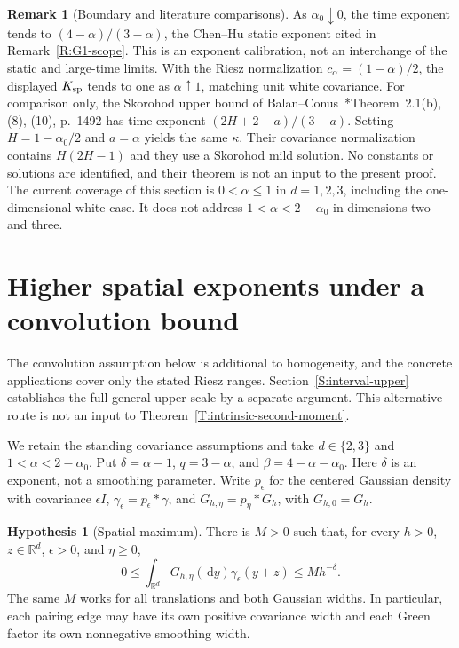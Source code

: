 \documentclass[12pt]{article}
\numberwithin{equation}{section}
\theoremstyle{definition}
\newtheorem{hypothesis}[theorem]{Hypothesis}
\newtheorem{remark}[theorem]{Remark}
\newcommand{\R}{\mathbb{R}}
\newcommand{\ud}{\,\mathrm{d}}
\begin{document}
\begin{remark}[Boundary and literature comparisons]\label{R:d1-comparisons}
  As $\alpha_0\downarrow0$, the time exponent tends to
  $(4-\alpha)/(3-\alpha)$, the Chen--Hu static exponent cited in
  Remark~\ref{R:G1-scope}. This is an exponent calibration, not an
  interchange of the static and large-time limits. With the Riesz
  normalization $c_\alpha=(1-\alpha)/2$, the displayed $K_{\rm sp}$
  tends to one as $\alpha\uparrow1$, matching unit white covariance.
  For comparison only, the Skorohod upper bound of
  Balan--Conus~\cite{balan.conus:16:intermittency}*{Theorem~2.1(b),
  (8), (10), p.~1492} has time exponent $(2H+2-a)/(3-a)$.
  Setting $H=1-\alpha_0/2$ and $a=\alpha$ yields the same $\kappa$.
  Their covariance normalization contains $H(2H-1)$ and they use a
  Skorohod mild solution. No constants or solutions are identified,
  and their theorem is not an input to the present proof. The current
  coverage of this section is $0<\alpha\le1$ in $d=1,2,3$, including
  the one-dimensional white case. It does not address
  $1<\alpha<2-\alpha_0$ in dimensions two and three.
\end{remark}

\section{Higher spatial exponents under a convolution bound}
\label{S:higher-alpha}

The convolution assumption below is additional to homogeneity, and the
concrete applications cover only the stated Riesz ranges.
Section~\ref{S:interval-upper} establishes the full general upper scale
by a separate argument. This alternative route is not an input to
Theorem~\ref{T:intrinsic-second-moment}.

We retain the standing covariance assumptions and take $d\in\{2,3\}$ and
$1<\alpha<2-\alpha_0$. Put $\delta=\alpha-1$, $q=3-\alpha$, and
$\beta=4-\alpha-\alpha_0$. Here $\delta$ is an exponent, not a smoothing
parameter. Write $p_\epsilon$ for the centered Gaussian density with
covariance $\epsilon I$, $\gamma_\epsilon=p_\epsilon*\gamma$, and
$G_{h,\eta}=p_\eta*G_h$, with $G_{h,0}=G_h$.

\begin{hypothesis}[Spatial maximum]\label{H:spatial-maximum}
  There is $M>0$ such that, for every $h>0$, $z\in\R^d$,
  $\epsilon>0$, and $\eta\ge0$,
  \begin{equation}\label{E:higher-convolution}
    0\le\int_{\R^d}G_{h,\eta}(\ud y)\gamma_\epsilon(y+z)
    \le M h^{-\delta}.
  \end{equation}
  The same $M$ works for all translations and both Gaussian widths.
  In particular, each pairing edge may have its own positive covariance
  width and each Green factor its own nonnegative smoothing width.
\end{hypothesis}
\end{document}
